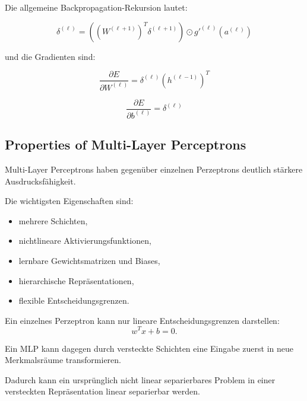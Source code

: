 \documentclass[11pt,a4paper]{scrartcl}
\begin{document}
\begin{answerbox}
    Die allgemeine Backpropagation-Rekursion lautet:

    \[
        \boxed{
            \delta^{(\ell)}
            =
            \left(
                (W^{(\ell+1)})^T
                \delta^{(\ell+1)}
            \right)
            \odot
            g'^{(\ell)}(a^{(\ell)})
        }
    \]

    und die Gradienten sind:

    \[
        \boxed{
            \frac{\partial E}{\partial W^{(\ell)}}
            =
            \delta^{(\ell)}
            \left(h^{(\ell-1)}\right)^T
        }
    \]

    \[
        \boxed{
            \frac{\partial E}{\partial b^{(\ell)}}
            =
            \delta^{(\ell)}
        }
    \]
\end{answerbox}

\subsection{Properties of Multi-Layer Perceptrons}

\begin{notebox}
    Multi-Layer Perceptrons haben gegenüber einzelnen Perzeptrons deutlich
    stärkere Ausdrucksfähigkeit.

    Die wichtigsten Eigenschaften sind:

    \begin{itemize}
        \item mehrere Schichten,
        \item nichtlineare Aktivierungsfunktionen,
        \item lernbare Gewichtsmatrizen und Biases,
        \item hierarchische Repräsentationen,
        \item flexible Entscheidungsgrenzen.
    \end{itemize}
\end{notebox}

\begin{solutionbox}
    Ein einzelnes Perzeptron kann nur lineare Entscheidungsgrenzen darstellen:
    \[
        w^Tx+b=0.
    \]

    Ein MLP kann dagegen durch versteckte Schichten eine Eingabe zuerst in neue
    Merkmalsräume transformieren.

    Dadurch kann ein ursprünglich nicht linear separierbares Problem in einer
    versteckten Repräsentation linear separierbar werden.
\end{solutionbox}
\end{document}
